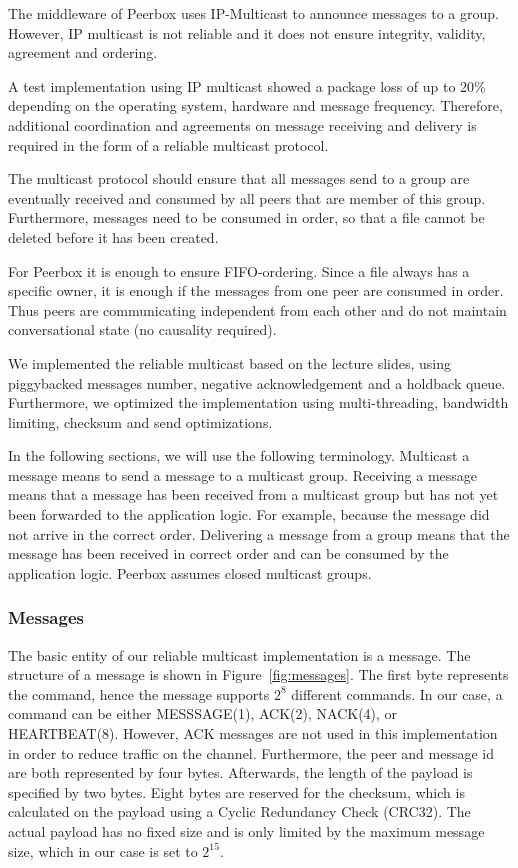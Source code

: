 The middleware of Peerbox uses IP-Multicast to announce messages to a group. However, IP multicast is not reliable and it does not ensure integrity, validity, agreement and ordering.

A test implementation  using  IP multicast showed a package loss of up to 20\% depending on the operating system, hardware and message frequency. 
Therefore, additional coordination and agreements on message receiving and delivery is required in the form of a reliable multicast protocol.


The multicast protocol should ensure that all messages send to a group are eventually received and consumed by all peers that are member of this group. Furthermore, messages need to be consumed in order, so that a file cannot be deleted before it has been created. 

For Peerbox it is enough to ensure FIFO-ordering. Since a file always has a specific owner, it is enough if the messages from one peer are consumed in order. Thus peers are communicating independent from each other and do not maintain conversational state (no causality required). 

We implemented the reliable multicast based on the lecture slides, using  piggybacked messages number, negative acknowledgement and a holdback queue. Furthermore, we optimized the implementation using  multi-threading, bandwidth limiting, checksum and send optimizations. 
    
In the following sections, we will use the following terminology. Multicast a message means to send a message to a multicast group. Receiving a message means that a message has been received from a multicast group but has not yet been forwarded to the application logic. For example, because the message did not arrive in the correct order. Delivering a message from a group  means that the message has been received in correct order and can be consumed by the application logic. Peerbox assumes closed multicast groups.

\subsubsection{Messages}
The basic entity of our reliable multicast implementation is a message. The structure of a message is shown in Figure~\ref{fig:messages}. The first byte represents the command, hence the message supports $2^8$ different commands. In our case, a command can be either MESSSAGE(1), ACK(2), NACK(4), or HEARTBEAT(8). However, ACK messages are not used in this implementation in order to reduce traffic on the channel. Furthermore,  the peer and message id are both represented by four bytes. Afterwards, the length of the payload is specified by two bytes. Eight bytes are reserved for the checksum, which is calculated on the payload using a Cyclic Redundancy Check (CRC32). The actual payload has no fixed size and is only limited by the maximum message size, which in our case is set to $2^{15}$.

